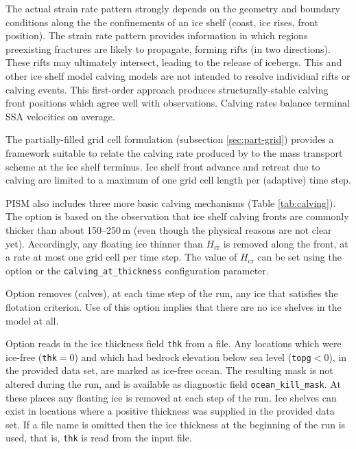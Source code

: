 The actual strain rate pattern strongly depends on the geometry and boundary conditions along the the confinements of an ice shelf (coast, ice rises, front position).  The strain rate pattern provides information in which regions preexisting fractures are likely to propagate, forming rifts (in two directions).  These rifts may ultimately intersect, leading to the release of icebergs. This and other ice shelf model calving models are not intended to resolve individual rifts or calving events. This first-order approach produces structurally-stable calving front positions which agree well with observations.  Calving rates balance terminal SSA velocities on average.

The partially-filled grid cell formulation (subsection \ref{sec:part-grid}) provides a framework suitable to relate the calving rate produced by  to the mass transport scheme at the ice shelf terminus.  Ice shelf front advance and retreat due to calving are limited to a maximum of one grid cell length per (adaptive) time step.

PISM also includes three more basic calving mechanisms (Table \ref{tab:calving}). The option  is based on the observation that ice shelf calving fronts are commonly thicker than about 150--250\,m (even though the physical reasons are not clear yet). Accordingly, any floating ice thinner than $H_{\textrm{cr}}$ is removed along the front, at a rate at most one grid cell per time step. The value of $H_{\mathrm{cr}}$ can be set using the  option or the \texttt{calving_at_thickness} configuration parameter.

Option  removes (calves), at each time step of the run, any ice that satisfies the flotation criterion.  Use of this option implies that there are no ice shelves in the model at all.

Option  reads in the ice thickness field \texttt{thk} from a file.  Any locations which were ice-free (\texttt{thk}$=0$) and which had bedrock elevation below sea level (\texttt{topg}$<0$), in the provided data set, are marked as ice-free ocean.  The resulting mask is not altered during the run, and is available as diagnostic field \texttt{ocean_kill_mask}.  At these places any floating ice is removed at each step of the run.  Ice shelves can exist in locations where a positive thickness was supplied in the provided data set.  If a file name is omitted then the ice thickness at the beginning of the run is used, that is, \texttt{thk} is read from the input file.


